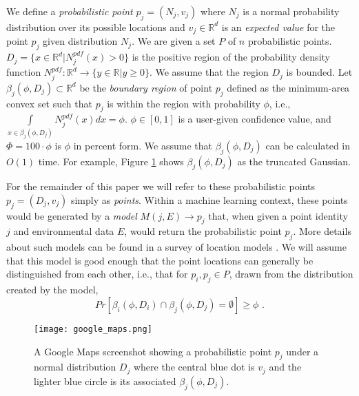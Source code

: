 \documentclass[11pt]{article}
\newcommand{\Real}{\mathbb{R}}
\begin{document}
We define a \emph{probabilistic point} $p_j = ({N_j}, v_j)$ where ${N_j}$ is a normal probability distribution over its possible locations and $v_j \in \Real^d$ is an \emph{expected value} for the point $p_j$ given distribution ${N_j}$.  We are given a set $P$ of $n$ probabilistic points. 
$D_j = \{ x \in \Real^d | N_j^{pdf}(x) > 0 \}$ is the positive region of the probability density function $N_j^{pdf}:\Real^d \rightarrow \{ y \in \Real | y \geq 0 \}$.  We assume that the region $D_j$ is bounded.  Let $\beta_j(\phi, D_j) \subset \Real^d$ be the \emph{boundary region} of point $p_j$ defined as the minimum-area convex set such that $p_j$ is within the region with probability $\phi$, i.e.,
$\int\limits_{x \in \beta_j(\phi, D_j)} N_j^{pdf}(x) dx = \phi$.  $\phi \in [0,1]$ is a user-given confidence value, and $\Phi = 100 \cdot \phi$ is $\phi$ in percent form.  We assume that $\beta_j(\phi, D_j)$ can be calculated in $O(1)$ time.  For example, Figure \ref{fig:google_maps} shows $\beta_j(\phi, D_j)$ as the truncated Gaussian.

For the remainder of this paper we will refer to these probabilistic points $p_j = (D_j, v_j)$ simply as \emph{points}. 
Within a machine learning context, these points would be generated by a \emph{model} $M(j, E) \rightarrow p_j$ that, when given a point identity $j$ and environmental data $E$, would return the probabilistic point $p_j$.  More details about such models can be found in a survey of location models \cite{Hightower01Location}.  We will assume that this model is good enough that the point locations can generally be distinguished from each other, i.e., that for $p_i, p_j \in P$, drawn from the distribution created by the model,
\[ Pr[ \beta_i(\phi, D_i) \cap \beta_j(\phi, D_j) = \emptyset] \geq \phi  \mbox{ .}\]

\begin{figure}
\begin{center}
 \texttt{[image: google\_maps.png]}
\caption{A Google Maps screenshot showing a probabilistic point $p_j$ under a normal distribution $D_j$ where the central blue dot is $v_j$ and the lighter blue circle is its associated $\beta_j(\phi, D_j)$.}
\label{fig:google_maps}
\vspace{-0.1in}
\end{center}
\end{figure}
\end{document}

